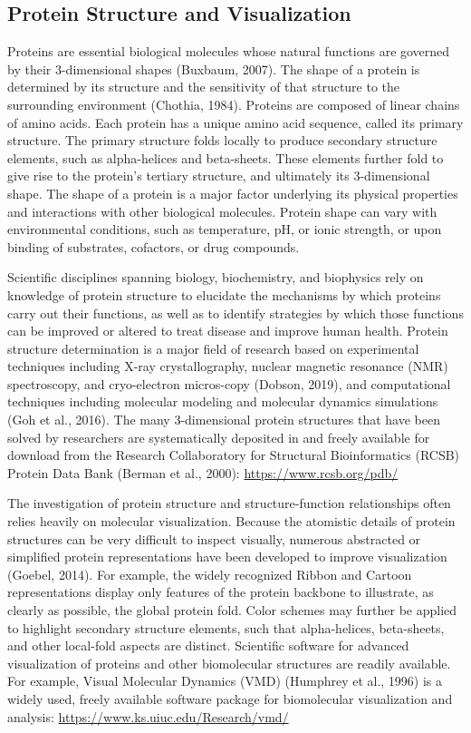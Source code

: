 \documentclass[11.5pt]{sig-alternate} %
\begin{document}
\begin{large}
\subsection*{Protein Structure and Visualization}

Proteins are essential biological molecules whose natural functions are governed by their 3-dimen\-sional shapes (Buxbaum, 2007). The shape of a protein is determined by its structure and the sensitivity of that structure to the surrounding environment (Chothia, 1984). Proteins are composed of linear chains of amino acids. Each protein has a unique amino acid sequence, called its primary structure. The primary structure folds locally to produce secondary structure elements, such as alpha-helices and beta-sheets. These elements further fold to give rise to the protein’s tertiary structure, and ultimately its 3-dimensional shape. The shape of a protein is a major factor underlying its physical properties and interactions with other biological molecules. Protein shape can vary with environmental conditions, such as temperature, pH,  or ionic strength, or upon binding of substrates, cofactors, or drug compounds.

Scientific disciplines spanning biology, biochemistry, and biophysics rely on knowledge of protein structure to elucidate the mechanisms by which proteins carry out their functions, as well as to identify strategies by which those functions can be improved or altered to treat disease and improve human health. Protein structure determination is a major field of research based on experimental techniques including X-ray crystallography, nuclear magnetic resonance (NMR) spectroscopy, and cryo-electron micros-copy (Dobson, 2019), and computational techniques including molecular modeling and molecular dynamics simulations (Goh et al., 2016). The many 3-dimensional protein structures that have been solved by researchers are systematically deposited in and freely available for download from the Research Collaboratory for Structural Bioinformatics (RCSB) Protein Data Bank (Berman et al., 2000): \url{https://www.rcsb.org/pdb/}

The investigation of protein structure and struc\-ture-function relationships often relies heavily on molecular visualization. Because the atomistic details of protein structures can be very difficult to inspect visually, numerous abstracted or simplified protein representations have been developed to improve visualization (Goebel, 2014). For example, the widely recognized Ribbon and Cartoon representations display only features of the protein backbone to illustrate, as clearly as possible, the global protein fold. Color schemes may further be applied to highlight secondary structure elements, such that alpha-helices, beta-sheets, and other local-fold aspects are distinct. Scientific software for advanced visualization of proteins and other biomolecular structures are readily available. For example, Visual Molecular Dynamics (VMD) (Humphrey et al., 1996) is a widely used, freely available software package for biomolecular visualization and analysis: \url{https://www.ks.uiuc.edu/Research/vmd/}


\end{large}
\end{document}
